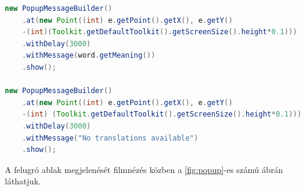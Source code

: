 \begin{lstlisting}[caption=A \textit{PopupMessageBuilder} használata, label={lst:popup}, language=java]
new PopupMessageBuilder()
    .at(new Point((int) e.getPoint().getX(), e.getY()
    -(int)(Toolkit.getDefaultToolkit().getScreenSize().height*0.1)))
    .withDelay(3000)
    .withMessage(word.getMeaning())
    .show();

new PopupMessageBuilder()
    .at(new Point((int) e.getPoint().getX(), e.getY()
    -(int) (Toolkit.getDefaultToolkit().getScreenSize().height*0.1)))
    .withDelay(3000)
    .withMessage("No translations available")
    .show();
\end{lstlisting}

A felugró ablak megjelenését filmnézés közben a \ref{fig:popup}-es számú ábrán láthatjuk.